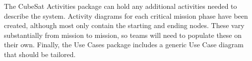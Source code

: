 The CubeSat Activities package can hold any additional activities needed to describe the system. Activity diagrams for each critical mission phase have been created, although most only contain the starting and ending nodes. These vary substantially from mission to mission, so teams will need to populate these on their own. Finally, the Use Cases package includes a generic Use Case diagram that should be tailored.
